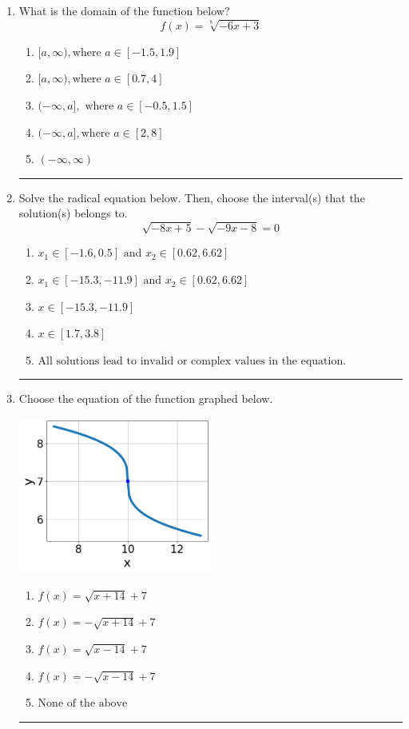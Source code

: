 \documentclass[14pt]{extbook}
\newcommand{\litem}[1]{\item#1\hspace*{-1cm}\rule{\textwidth}{0.4pt}}
\begin{document}
\begin{enumerate}
{\begin{enumerate}[label=\Alph*.]
\end{enumerate} }
\litem{
What is the domain of the function below?\[ f(x) = \sqrt[8]{-6 x + 3} \]\begin{enumerate}[label=\Alph*.]
\item \( [a, \infty), \text{where } a \in [-1.5, 1.9] \)
\item \( [a, \infty), \text{where } a \in [0.7, 4] \)
\item \( (-\infty, a], \text{ where } a \in [-0.5, 1.5] \)
\item \( (-\infty, a], \text{where } a \in [2, 8] \)
\item \( (-\infty, \infty) \)

\end{enumerate} }
\litem{
Solve the radical equation below. Then, choose the interval(s) that the solution(s) belongs to.\[ \sqrt{-8 x + 5} - \sqrt{-9 x - 8} = 0 \]\begin{enumerate}[label=\Alph*.]
\item \( x_1 \in [-1.6, 0.5] \text{ and } x_2 \in [0.62,6.62] \)
\item \( x_1 \in [-15.3, -11.9] \text{ and } x_2 \in [0.62,6.62] \)
\item \( x \in [-15.3,-11.9] \)
\item \( x \in [1.7,3.8] \)
\item \( \text{All solutions lead to invalid or complex values in the equation.} \)

\end{enumerate} }
\litem{
Choose the equation of the function graphed below.
\begin{center}
    \includegraphics[width=0.5\textwidth]{../Figures/radicalGraphToEquationCopyC.png}
\end{center}
\begin{enumerate}[label=\Alph*.]
\item \( f(x) = \sqrt{x + 14} + 7 \)
\item \( f(x) = - \sqrt{x + 14} + 7 \)
\item \( f(x) = \sqrt{x - 14} + 7 \)
\item \( f(x) = - \sqrt{x - 14} + 7 \)
\item \( \text{None of the above} \)

\end{enumerate} }
\end{enumerate}
\end{document}
